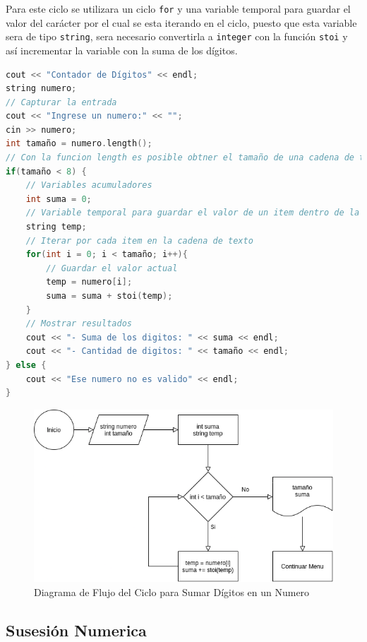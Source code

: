 \documentclass[12pt]{article}
\begin{document}
Para este ciclo se utilizara un ciclo \verb+for+ y una variable temporal para guardar el valor del carácter por el cual se esta iterando en el ciclo, puesto que esta variable sera de tipo \verb+string+, sera necesario convertirla a \verb+integer+ con la función \verb+stoi+ y así incrementar la variable con la suma de los dígitos.


\begin{lstlisting}[language=c++]
cout << "Contador de Dígitos" << endl;
string numero;
// Capturar la entrada
cout << "Ingrese un numero:" << "";
cin >> numero;
int tamaño = numero.length();
// Con la funcion length es posible obtner el tamaño de una cadena de texto
if(tamaño < 8) {
    // Variables acumuladores
    int suma = 0;
    // Variable temporal para guardar el valor de un item dentro de la cadena de texto
    string temp;
    // Iterar por cada item en la cadena de texto
    for(int i = 0; i < tamaño; i++){
        // Guardar el valor actual
        temp = numero[i];
        suma = suma + stoi(temp);
    }
    // Mostrar resultados
    cout << "- Suma de los digitos: " << suma << endl;
    cout << "- Cantidad de digitos: " << tamaño << endl;
} else {
    cout << "Ese numero no es valido" << endl;
}
\end{lstlisting}

\begin{figure}[H]
    \caption{Diagrama de Flujo del Ciclo para Sumar Dígitos en un Numero}
    \centering
    \includegraphics[scale=0.6]{programa2_ciclo.png}
\end{figure}

\pagebreak

\subsection{Susesión Numerica}
\end{document}
